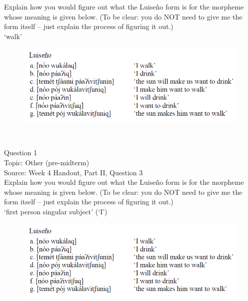 \documentclass[12pt]{article}
\begin{document}
Explain how you would figure out what the Luiseño form is for the morpheme whose meaning is given below. (To be clear: you do NOT need to give me the form itself -- just explain the process of figuring it out.)\\

‘walk’

\begin{figure}[H]
\includegraphics{../images/luiseno.png}
\end{figure}

\newpage

\begin{center}
\textbf{{\color{red}{\HUGE END OF EXAM}}}\\

\end{center}
\newpage

\begin{center}
\textbf{{\color{blue}{\HUGE START OF EXAM\\}}}

\textbf{{\color{blue}{\HUGE Student ID: 41381\\}}}

\textbf{{\color{blue}{\HUGE 4:40\\}}}

\end{center}
\newpage

{\large Question 1}\\

Topic: Other (pre-midterm)\\
Source: Week 4 Handout, Part II, Question 3\\

Explain how you would figure out what the Luiseño form is for the morpheme whose meaning is given below. (To be clear: you do NOT need to give me the form itself -- just explain the process of figuring it out.)\\

‘first person singular subject’ (‘I’)

\begin{figure}[H]
\includegraphics{../images/luiseno.png}
\end{figure}
\end{document}
